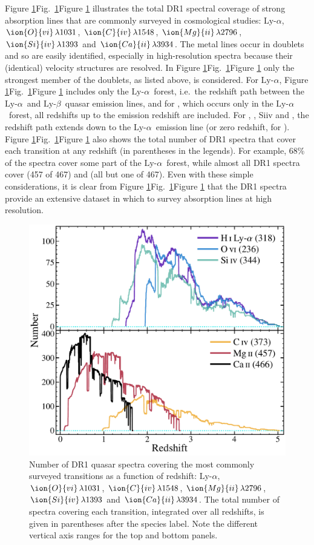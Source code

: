\documentclass[fleqn,usenatbib,usedcolumn]{mnras}
\newcommand{\Fref}[1]{\ifhmode \ifnum\spacefactor=1001 Figure \ref{#1}\else Fig.\ \ref{#1}\fi \else Figure \ref{#1}\fi}
\newcommand{\lya}{\ensuremath{\textrm{Ly-}\alpha}}
\newcommand{\lyb}{\ensuremath{\textrm{Ly-}\beta}}
\newcommand{\tran}[3]{\ensuremath{\ion{#1}{#2}\,\lambda\textrm{#3}}}
\begin{document}
\Fref{f:trancov} illustrates the total DR1 spectral coverage of strong absorption lines that are commonly surveyed in cosmological studies:  \lya, \tran{O}{vi}{1031}, \tran{C}{iv}{1548}, \tran{Mg}{ii}{2796}, \tran{Si}{iv}{1393} and \tran{Ca}{ii}{3934}. The metal lines occur in doublets and so are easily identified, especially in high-resolution spectra because their (identical) velocity structures are resolved. In \Fref{f:trancov} only the strongest member of the doublets, as listed above, is considered. For  \lya, \Fref{f:trancov} includes only the \lya\ forest, i.e.\ the redshift path between the \lya\ and \lyb\ quasar emission lines, and for , which occurs only in the \lya\ forest, all redshifts up to the emission redshift are included. For , , {Si}{iv} and , the redshift path extends down to the \lya\ emission line (or zero redshift, for ). \Fref{f:trancov} also shows the total number of DR1 spectra that cover each transition at any redshift (in parentheses in the legends). For example, 68\% of the spectra cover some part of the \lya\ forest, while almost all DR1 spectra cover  (457 of 467) and  (all but one of 467). Even with these simple considerations, it is clear from \Fref{f:trancov} that the DR1 spectra provide an extensive dataset in which to survey absorption lines at high resolution.

\begin{figure}
\begin{center}
\includegraphics[width=0.90\columnwidth]{DR1_trancoverage.pdf}
\vspace{-1em}
\caption{Number of DR1 quasar spectra covering the most commonly surveyed transitions as a function of redshift:  \lya, \tran{O}{vi}{1031}, \tran{C}{iv}{1548}, \tran{Mg}{ii}{2796}, \tran{Si}{iv}{1393} and \tran{Ca}{ii}{3934}. The total number of spectra covering each transition, integrated over all redshifts, is given in parentheses after the species label. Note the different vertical axis ranges for the top and bottom panels.}
\label{f:trancov}
\end{center}
\end{figure}
\end{document}
